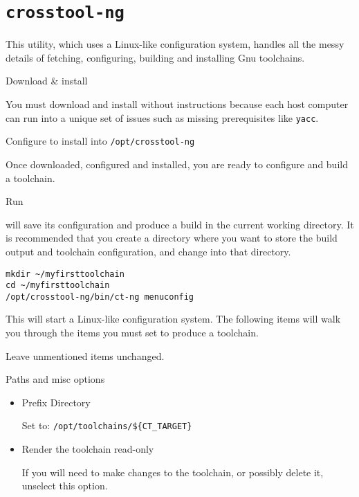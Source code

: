 \section{\texttt{crosstool-ng}}

This utility, which uses a Linux-like configuration system, handles
all the messy details of fetching, configuring, building and
installing Gnu toolchains.

\begin{description}
\item Download \& install \ctng

  You must download and install \ctng without instructions because
  each host computer can run into a unique set of issues such as
  missing prerequisites like \texttt{yacc}.

  Configure \ctng to install into \texttt{/opt/crosstool-ng}

  Once downloaded, configured and installed, you are ready to
  configure and build a toolchain.

  \item Run \ctng

    \ctng will save its configuration and produce a build in the
    current working directory.  It is recommended that you create a
    directory where you want to store the build output and toolchain
    configuration, and change into that directory.

\begin{verbatim}
mkdir ~/myfirsttoolchain
cd ~/myfirsttoolchain
/opt/crosstool-ng/bin/ct-ng menuconfig
\end{verbatim}

    This will start a Linux-like configuration system.  The following
    items will walk you through the items you must set to produce a
    toolchain.

    Leave unmentioned items unchanged.

    \begin{description}

    \item Paths and misc options

      \begin{itemize}
      \item{Prefix Directory}

        Set to: \texttt{/opt/toolchains/\$\{CT\_TARGET\}}

      \item{Render the toolchain read-only}

        If you will need to make changes to the toolchain, or possibly
        delete it, unselect this option.


\end{itemize}
\end{description}
\end{description}
